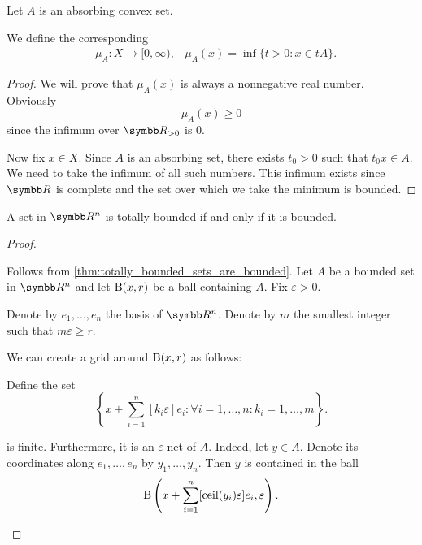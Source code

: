\begin{definition}\label{def:minkowski_functional}
  Let \( A \) is an absorbing convex set.

  We define the corresponding 
  \begin{align*}
    &\mu_A: X \to [0, \infty),
    &\mu_A(x) = \inf \{ t > 0 \colon x \in tA \}.
  \end{align*}
\end{definition}
\begin{proof}
  We will prove that \( \mu_A(x) \) is always a nonnegative real number. Obviously
  \begin{equation*}
    \mu_A(x) \geq 0
  \end{equation*}
  since the infimum over \( \R_{>0} \) is \( 0 \).

  Now fix \( x \in X \). Since \( A \) is an absorbing set, there exists \( t_0 > 0 \) such that \( t_0 x \in A \). We need to take the infimum of all such numbers. This infimum exists since \( \R \) is complete and the set over which we take the minimum is bounded.
\end{proof}

\begin{proposition}\label{thm:rn_bounded_iff_totally_bounded}
  A set in \( \R^n \) is totally bounded if and only if it is bounded.
\end{proposition}
\begin{proof}
  \begin{description}
    \Implies Follows from \cref{thm:totally_bounded_sets_are_bounded}.
    \ImpliedBy Let \( A \) be a bounded set in \( \R^n \) and let \( \operatorname{B}(x, r) \) be a ball containing \( A \). Fix \( \varepsilon > 0 \).

    Denote by \( e_1, \ldots, e_n \) the basis of \( \R^n \). Denote by \( m \) the smallest integer such that \( m \varepsilon \geq r \).

    We can create a grid around \( \operatorname{B}(x, r) \) as follows:

    Define the set
    \begin{equation*}
      \left\{ x + \sum_{i=1}^n [k_i \varepsilon] e_i \colon \forall i = 1, \ldots, n: k_i = 1, \ldots, m \right\}.
    \end{equation*}

    is finite. Furthermore, it is an \( \varepsilon \)-net of \( A \). Indeed, let \( y \in A \). Denote its coordinates along \( e_1, \ldots, e_n \) by \( y_1, \ldots, y_n \). Then \( y \) is contained in the ball
    \begin{equation*}
      \operatorname{B}\left(x + \sum_{i=1}^n [\operatorname{ceil}(y_i) \varepsilon] e_i, \varepsilon \right).
    \end{equation*}
  \end{description}
\end{proof}

